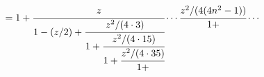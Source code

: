 \[=1+\cfrac{z}{1-(z/2)+\cfrac{z^{2}/(4\cdot 3)}{1+\cfrac{z^{2}/(4\cdot 15)}{1+%
\cfrac{z^{2}/(4\cdot 35)}{1+}}}}\cdots\cfrac{z^{2}/(4(4n^{2}-1))}{1+}\cdots\]
